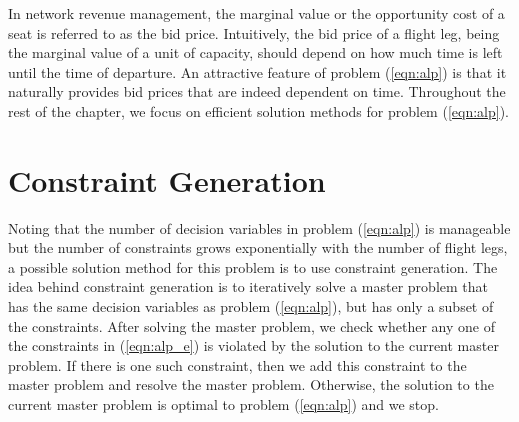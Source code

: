In network revenue management, the marginal value or the opportunity cost of a seat is referred to as the bid price. Intuitively, the bid price of a flight leg, being the marginal value of a unit of capacity, should depend on how much time is left until the time of departure. An attractive feature of problem (\ref{eqn:alp}) is that it naturally provides bid prices that are indeed dependent on time. Throughout the rest of the chapter, we focus on efficient solution methods for problem (\ref{eqn:alp}).


\section{Constraint Generation}
\label{sec:con_gen}

Noting that the number of decision variables in problem (\ref{eqn:alp}) is manageable but the number of constraints grows exponentially with the number of flight legs, a possible solution method for this problem is to use constraint generation. The idea behind constraint generation is to iteratively solve a master problem that has the same decision variables as problem (\ref{eqn:alp}), but has only a subset of the constraints. After solving the master problem, we check whether any one of the constraints in (\ref{eqn:alp_e}) is violated by the solution to the current master problem. If there is one such constraint, then we add this constraint to the master problem and resolve the master problem. Otherwise, the solution to the current master problem is optimal to problem (\ref{eqn:alp}) and we stop.


